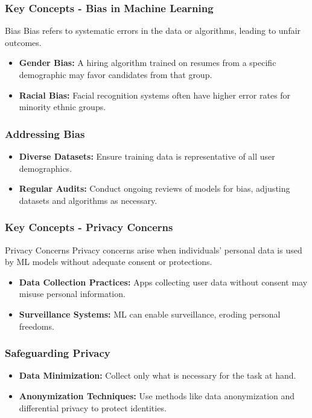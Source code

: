 \documentclass[aspectratio=169]{beamer}
\begin{document}
\begin{frame}[fragile]
    \frametitle{Key Concepts - Bias in Machine Learning}
    \begin{block}{Bias}
        Bias refers to systematic errors in the data or algorithms, leading to unfair outcomes. 
    \end{block}
    \begin{itemize}
        \item \textbf{Gender Bias:} A hiring algorithm trained on resumes from a specific demographic may favor candidates from that group.
        \item \textbf{Racial Bias:} Facial recognition systems often have higher error rates for minority ethnic groups.
    \end{itemize}
\end{frame}

\begin{frame}[fragile]
    \frametitle{Addressing Bias}
    \begin{itemize}
        \item \textbf{Diverse Datasets:} Ensure training data is representative of all user demographics.
        \item \textbf{Regular Audits:} Conduct ongoing reviews of models for bias, adjusting datasets and algorithms as necessary.
    \end{itemize}
\end{frame}

\begin{frame}[fragile]
    \frametitle{Key Concepts - Privacy Concerns}
    \begin{block}{Privacy Concerns}
        Privacy concerns arise when individuals' personal data is used by ML models without adequate consent or protections.
    \end{block}
    \begin{itemize}
        \item \textbf{Data Collection Practices:} Apps collecting user data without consent may misuse personal information.
        \item \textbf{Surveillance Systems:} ML can enable surveillance, eroding personal freedoms.
    \end{itemize}
\end{frame}

\begin{frame}[fragile]
    \frametitle{Safeguarding Privacy}
    \begin{itemize}
        \item \textbf{Data Minimization:} Collect only what is necessary for the task at hand.
        \item \textbf{Anonymization Techniques:} Use methods like data anonymization and differential privacy to protect identities.
    \end{itemize}
\end{frame}
\end{document}
